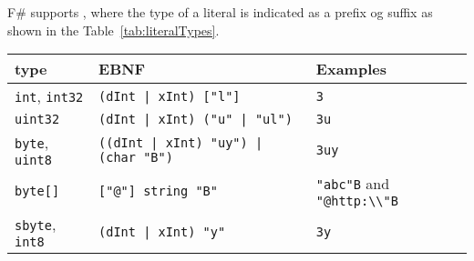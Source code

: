 F\# supports , where the type of a literal is indicated as a prefix og suffix as shown in the Table~\ref{tab:literalTypes}.
\begin{table}
  \centering
  \begin{tabular}{|l|l|l|}
    \hline
    type & EBNF & Examples \\
    \hline
    \lstinline!int!, \lstinline!int32! & \lstinline[language=ebnf]!(dInt | xInt) ["l"]!  & \lstinline!3! \\
    \lstinline!uint32! & \lstinline[language=ebnf]!(dInt | xInt) ("u" | "ul")! & \lstinline!3u! \\
    \lstinline!byte!, \lstinline!uint8! & \lstinline[language=ebnf]!((dInt | xInt) "uy") | (char "B")!  & \lstinline!3uy!  \\
    \lstinline!byte[]! & \lstinline[language=ebnf]!["@"] string "B"!  & \lstinline!"abc"B! and \lstinline!"@http:\\"B!  \\
    \lstinline!sbyte!, \lstinline!int8! & \lstinline[language=ebnf]!(dInt | xInt) "y"! & \lstinline!3y!  \\

\end{tabular}
\end{table}
